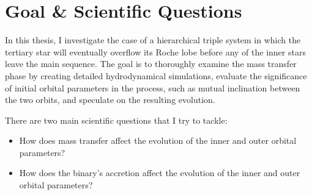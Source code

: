 \section{Goal \& Scientific Questions}

In this thesis, I investigate the case of a hierarchical triple system in which the tertiary star will eventually overflow its Roche lobe before any of the inner stars leave the main sequence. The goal is to thoroughly examine the mass transfer phase by creating detailed hydrodynamical simulations, evaluate the significance of initial orbital parameters in the process, such as mutual inclination between the two orbits, and speculate on the resulting evolution.

There are two main scientific questions that I try to tackle:

\begin{itemize}
    \item How does mass transfer affect the evolution of the inner and outer orbital parameters?
    \item How does the binary's accretion affect the evolution of the inner and outer orbital parameters?
\end{itemize}



